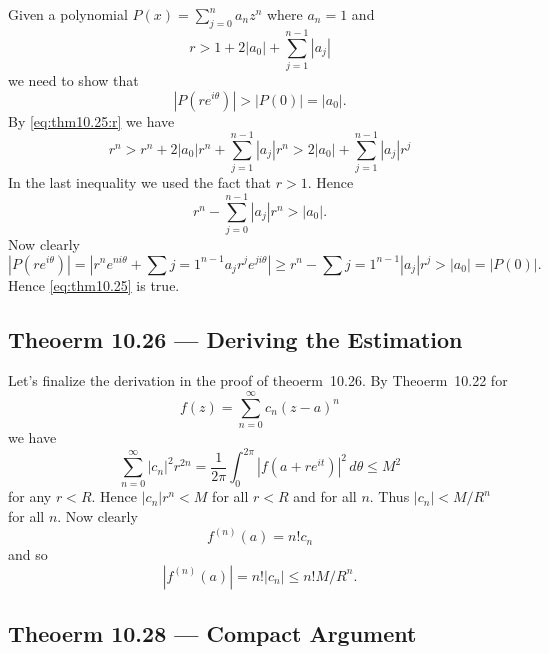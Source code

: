 Given a polynomial \(P(x) = \sum_{j=0}^n a_nz^n\) where \(a_n=1\)
and
\begin{equation} \label{eq:thm10.25:r}
r > 1 + 2|a_0| + \sum_{j=1}^{n-1} |a_j|
\end{equation}
we need to show that
\begin{equation} \label{eq:thm10.25}
\left| P(re^{i\theta})\right| > |P(0)| = |a_0|.
\end{equation}
By \eqref{eq:thm10.25:r} we have
\begin{equation*}
r^n
> r^n + 2|a_0|r^n + \sum_{j=1}^{n-1} |a_j|r^n
> 2|a_0| + \sum_{j=1}^{n-1} |a_j|r^j
\end{equation*}
In the last inequality we used the fact that \(r>1\).
Hence
\begin{equation*}
r^n - \sum_{j=0}^{n-1} |a_j|r^n > |a_0|.
\end{equation*}
Now clearly
\begin{equation*}
\left| P(re^{i\theta})\right|
= \left| r^ne^{ni\theta} + \sum{j=1}^{n-1} a_j r^j e^{ji\theta}\right|
\geq r^n - \sum{j=1}^{n-1} |a_j| r^j > |a_0| = |P(0)|.
\end{equation*}
Hence \eqref{eq:thm10.25} is true.

\subsection{Theoerm 10.26 --- Deriving the Estimation}

Let's finalize the derivation in the proof of theoerm~10.26.
By Theoerm~10.22 for
\begin{equation*}
f(z) = \sum_{n=0}^\infty c_n(z-a)^n
\end{equation*}
we have
\begin{equation*}
\sum_{n=0}^\infty |c_n|^2 r^{2n}
= \frac{1}{2\pi}\int_0^{2\pi} \left|f(a+re^{it})\right|^2\,d\theta \leq M^2
\end{equation*}
for any \(r<R\). Hence \(|c_n|r^n < M\) for all \(r<R\) and for all $n$.
Thus \(|c_n| < M/R^n\) for all $n$. Now clearly
\begin{equation*}
f^{(n)}(a) = n!c_n
\end{equation*}
and so
\begin{equation*}
\left|f^{(n)}(a)\right| = n!|c_n| \leq n!M/R^n.
\end{equation*}


\subsection{Theoerm 10.28 --- Compact Argument}

